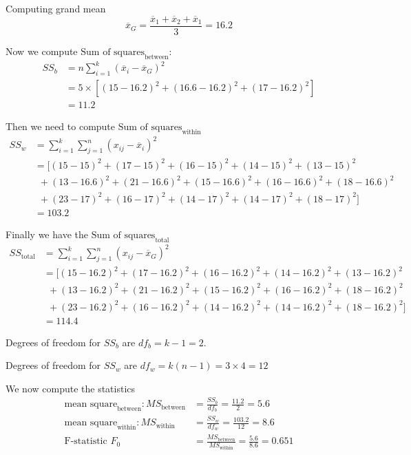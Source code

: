 \documentclass[12pt, oneside]{article}
\begin{document}
\begin{enumerate}
{    Computing grand mean
    \[\overline{x}_G = \frac{\overline{x}_1 + \overline{x}_2 + \overline{x}_1}{3} = 16.2\]

    Now we compute \(\text{Sum of squares}_{\text{between}}\):
    \begin{align*}
        SS_b &= n \sum_{i=1}^{k} (\overline{x}_i - \overline{x}_G)^2 \\
            &= 5 \times [ (15 - 16.2)^2 + (16.6 - 16.2)^2 + (17 - 16.2)^2 ] \\
            &= 11.2
    \end{align*}

    Then we need to compute \(\text{Sum of squares}_{\text{within}}\)
    \begin{align*}
        SS_w &= \sum_{i=1}^{k} \sum_{j=1}^{n} (x_{ij} - \overline{x}_i)^2 \\
             &= [ (15 - 15)^2 + (17 - 15)^2 + (16 - 15)^2 + (14 - 15)^2 + (13-15)^2 \\
             &~~    + (13 - 16.6)^2 + (21 - 16.6)^2 + (15 - 16.6)^2 + (16 - 16.6)^2 + (18 - 16.6)^2 \\
             &~~    + (23 - 17)^2 + (16 - 17)^2 + (14 - 17)^2 + (14 - 17)^2 + (18 - 17)^2 ] \\
             &= 103.2
    \end{align*}
    
    Finally we have the \(\text{Sum of squares}_{\text{total}}\)
    \begin{align*}
        SS_{\text{total}} &= \sum_{i=1}^{k} \sum_{j=1}^{n} (x_{ij} - \overline{x}_G)^2 \\
            &= [ (15 - 16.2)^2 + (17 - 16.2)^2 + (16 - 16.2)^2 + (14 - 16.2)^2 + (13-16.2)^2 \\
            &~~    + (13 - 16.2)^2 + (21 - 16.2)^2 + (15 - 16.2)^2 + (16 - 16.2)^2 + (18 - 16.2)^2 \\
            &~~    + (23 - 16.2)^2 + (16 - 16.2)^2 + (14 - 16.2)^2 + (14 - 16.2)^2 + (18 - 16.2)^2 ] \\
            &= 114.4
    \end{align*}

    Degrees of freedom for \(SS_b\) are \(df_b = k - 1 = 2\).

    Degrees of freedom for \(SS_w\) are \(df_w = k(n - 1) = 3 \times 4 = 12\)

    We now compute the statistics
    \begin{align*}
        {\text{mean square}}_{\text{between}}: MS_{\text{between}} &= \frac{SS_b}{df_b} = \frac{11.2}{2} = 5.6 \\
        \text{mean square}_{\text{within}}: MS_{\text{within}} &= \frac{SS_w}{df_w} = \frac{103.2}{12} = 8.6 \\
        \text{F-statistic } F_0 &= \frac{MS_{\text{between}}}{MS_{\text{within}}} = \frac{5.6}{8.6} = 0.651
    \end{align*}

}
\end{enumerate}
\end{document}
